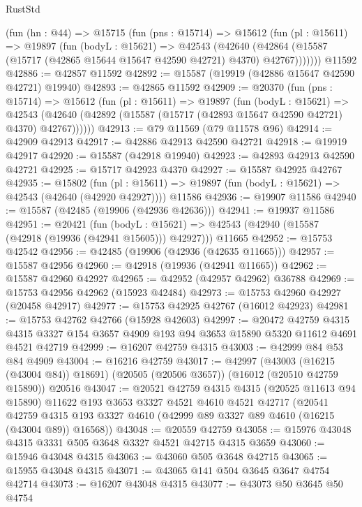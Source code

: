 \begin{lexlean}{RustStd}
\begin{coremodule}
    (fun (hn : @44) =>
    @15715
      (fun (pns : @15714) =>
      @15612
        (fun (pl : @15611) =>
        @19897
          (fun (bodyL : @15621) =>
          @42543
            (@42640
              (@42864 (@15587 (@15717 (@42865 @15644 @15647 @42590 @42721) @4370) @42767)))))))
    @11592
@42886 := @42857 @11592
@42892 := @15587 (@19919 (@42886 @15647 @42590 @42721) @19940)
@42893 := @42865 @11592
@42909 := @20370
    (fun (pns : @15714) =>
    @15612
      (fun (pl : @15611) =>
      @19897
        (fun (bodyL : @15621) =>
        @42543 (@42640 (@42892 (@15587 (@15717 (@42893 @15647 @42590 @42721) @4370) @42767))))))
@42913 := @79 @11569 (@79 @11578 @96)
@42914 := @42909 @42913
@42917 := @42886 @42913 @42590 @42721
@42918 := @19919 @42917
@42920 := @15587 (@42918 @19940)
@42923 := @42893 @42913 @42590 @42721
@42925 := @15717 @42923 @4370
@42927 := @15587 @42925 @42767
@42935 := @15802
    (fun (pl : @15611) => @19897 (fun (bodyL : @15621) => @42543 (@42640 (@42920 @42927))))
    @11586
@42936 := @19907 @11586
@42940 := @15587 (@42485 (@19906 (@42936 @42636)))
@42941 := @19937 @11586
@42951 := @20421
    (fun (bodyL : @15621) => @42543 (@42940 (@15587 (@42918 (@19936 (@42941 @15605))) @42927)))
    @11665
@42952 := @15753 @42542
@42956 := @42485 (@19906 (@42936 (@42635 @11665)))
@42957 := @15587 @42956
@42960 := @42918 (@19936 (@42941 @11665))
@42962 := @15587 @42960 @42927
@42965 := @42952 (@42957 @42962) @36788
@42969 := @15753 @42956 @42962 (@15923 @42484)
@42973 := @15753 @42960 @42927 (@20458 @42917)
@42977 := @15753 @42925 @42767 (@16012 @42923)
@42981 := @15753 @42762 @42766 (@15928 @42603)
@42997 := @20472
    @42759
    @4315
    @4315
    @3327
    @154
    @3657
    @4909
    @193
    @94
    @3653
    @15890
    @5320
    @11612
    @4691
    @4521
    @42719
@42999 := @16207 @42759 @4315
@43003 := @42999 @84 @53 @84 @4909
@43004 := @16216 @42759
@43017 := @42997
    (@43003 (@16215 (@43004 @84)) @18691)
    (@20505 (@20506 @3657))
    (@16012 (@20510 @42759 @15890))
    @20516
@43047 := @20521
    @42759
    @4315
    @4315
    (@20525 @11613 @94 @15890)
    @11622
    @193
    @3653
    @3327
    @4521
    @4610
    @4521
    @42717
    (@20541 @42759 @4315 @193 @3327 @4610 (@42999 @89 @3327 @89 @4610 (@16215 (@43004 @89)) @16568))
@43048 := @20559 @42759
@43058 := @15976 @43048 @4315 @3331 @505 @3648 @3327 @4521 @42715 @4315 @3659
@43060 := @15946 @43048 @4315
@43063 := @43060 @505 @3648 @42715
@43065 := @15955 @43048 @4315
@43071 := @43065 @141 @504 @3645 @3647 @4754 @42714
@43073 := @16207 @43048 @4315
@43077 := @43073 @50 @3645 @50 @4754

\end{coremodule}
\end{lexlean}
